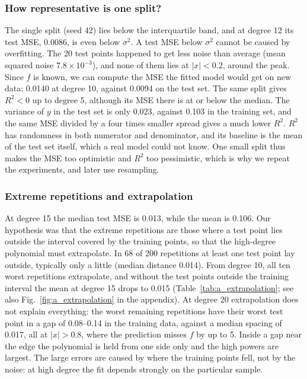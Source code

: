 \subsubsection{How representative is one split?}

The single split (seed 42) lies below the interquartile band, and at degree 12 its test MSE, 0.0086, is even below $\sigma^2$. A test MSE below $\sigma^2$ cannot be caused by overfitting. The 20 test points happened to get less noise than average (mean squared noise $7.8\times10^{-3}$), and none of them lies at $|x| < 0.2$, around the peak. Since $f$ is known, we can compute the MSE the fitted model would get on new data: 0.0140 at degree 10, against 0.0094 on the test set. The same split gives $R^2 < 0$ up to degree 5, although its MSE there is at or below the median. The variance of $y$ in the test set is only 0.023, against 0.103 in the training set, and the same MSE divided by a four times smaller spread gives a much lower $R^2$. $R^2$ has randomness in both numerator and denominator, and its baseline is the mean of the test set itself, which a real model could not know. One small split thus makes the MSE too optimistic and $R^2$ too pessimistic, which is why we repeat the experiments, and later use resampling.

\subsubsection{Extreme repetitions and extrapolation}\label{sec:res_extreme}

At degree 15 the median test MSE is 0.013, while the mean is 0.106. Our hypothesis was that the extreme repetitions are those where a test point lies outside the interval covered by the training points, so that the high-degree polynomial must extrapolate. In 68 of 200 repetitions at least one test point lay outside, typically only a little (median distance 0.014). From degree 10, all ten worst repetitions extrapolate, and without the test points outside the training interval the mean at degree 15 drops to 0.015 (Table~\ref{tab:a_extrapolation}; see also Fig.~\ref{fig:a_extrapolation} in the appendix). At degree 20 extrapolation does not explain everything: the worst remaining repetitions have their worst test point in a gap of 0.08--0.14 in the training data, against a median spacing of 0.017, all at $|x| > 0.8$, where the prediction misses $f$ by up to 5. Inside a gap near the edge the polynomial is held from one side only and the high powers are largest. The large errors are caused by where the training points fell, not by the noise: at high degree the fit depends strongly on the particular sample.

